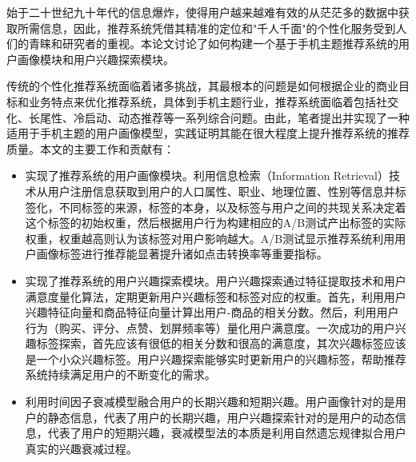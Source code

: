 \begin{cnabstract}
始于二十世纪九十年代的信息爆炸，使得用户越来越难有效的从茫茫多的数据中获取所需信息，因此，推荐系统凭借其精准的定位和"千人千面"的个性化服务受到人们的青睐和研究者的重视。本论文讨论了如何构建一个基于手机主题推荐系统的用户画像模块和用户兴趣探索模块。

传统的个性化推荐系统面临着诸多挑战，其最根本的问题是如何根据企业的商业目标和业务特点来优化推荐系统，具体到手机主题行业，推荐系统面临着包括社交化、长尾性、冷启动、动态推荐等一系列综合问题。由此，笔者提出并实现了一种适用于手机主题的用户画像模型，实践证明其能在很大程度上提升推荐系统的推荐质量。本文的主要工作和贡献有：
\begin{itemize}
	\item 实现了推荐系统的用户画像模块。利用信息检索（Information Retrieval）技术从用户注册信息获取到用户的人口属性、职业、地理位置、性别等信息并标签化，不同标签的来源，标签的本身，以及标签与用户之间的共现关系决定着这个标签的初始权重，然后根据用户行为构建相应的A/B测试产出标签的实际权重，权重越高则认为该标签对用户影响越大。A/B测试显示推荐系统利用用户画像标签进行推荐能显著提升诸如点击转换率等重要指标。
	\item 实现了推荐系统的用户兴趣探索模块。用户兴趣探索通过特征提取技术和用户满意度量化算法，定期更新用户兴趣标签和标签对应的权重。首先，利用用户兴趣特征向量和商品特征向量计算出用户-商品的相关分数。然后，利用用户行为（购买、评分、点赞、划屏频率等）量化用户满意度。一次成功的用户兴趣标签探索，首先应该有很低的相关分数和很高的满意度，其次兴趣标签应该是一个小众兴趣标签。用户兴趣探索能够实时更新用户的兴趣标签，帮助推荐系统持续满足用户的不断变化的需求。
	\item 利用时间因子衰减模型融合用户的长期兴趣和短期兴趣。用户画像针对的是用户的静态信息，代表了用户的长期兴趣，用户兴趣探索针对的是用户的动态信息，代表了用户的短期兴趣，衰减模型法的本质是利用自然遗忘规律拟合用户真实的兴趣衰减过程。
\end{itemize}

\end{cnabstract}

